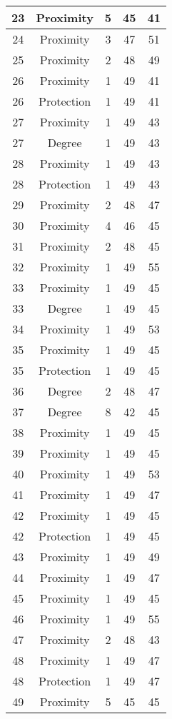 \documentclass[results.tex]{subfiles}
\begin{document}
\begin{center}
\begin{tabular}{| c || c | c | c | c |}
    \hline
    23 & Proximity & 5 & 45 & 41 \\ 
    \hline
    24 & Proximity & 3 & 47 & 51 \\ 
    \hline
    25 & Proximity & 2 & 48 & 49 \\ 
    \hline
    26 & Proximity & 1 & 49 & 41 \\ 
    \hline
    26 & Protection & 1 & 49 & 41 \\ 
    \hline
    27 & Proximity & 1 & 49 & 43 \\ 
    \hline
    27 & Degree & 1 & 49 & 43 \\ 
    \hline
    28 & Proximity & 1 & 49 & 43 \\ 
    \hline
    28 & Protection & 1 & 49 & 43 \\ 
    \hline
    29 & Proximity & 2 & 48 & 47 \\ 
    \hline
    30 & Proximity & 4 & 46 & 45 \\ 
    \hline
    31 & Proximity & 2 & 48 & 45 \\ 
    \hline
    32 & Proximity & 1 & 49 & 55 \\ 
    \hline
    33 & Proximity & 1 & 49 & 45 \\ 
    \hline
    33 & Degree & 1 & 49 & 45 \\ 
    \hline
    34 & Proximity & 1 & 49 & 53 \\ 
    \hline
    35 & Proximity & 1 & 49 & 45 \\ 
    \hline
    35 & Protection & 1 & 49 & 45 \\ 
    \hline
    36 & Degree & 2 & 48 & 47 \\ 
    \hline
    37 & Degree & 8 & 42 & 45 \\ 
    \hline
    38 & Proximity & 1 & 49 & 45 \\ 
    \hline
    39 & Proximity & 1 & 49 & 45 \\ 
    \hline
    40 & Proximity & 1 & 49 & 53 \\ 
    \hline
    41 & Proximity & 1 & 49 & 47 \\ 
    \hline
    42 & Proximity & 1 & 49 & 45 \\ 
    \hline
    42 & Protection & 1 & 49 & 45 \\ 
    \hline
    43 & Proximity & 1 & 49 & 49 \\ 
    \hline
    44 & Proximity & 1 & 49 & 47 \\ 
    \hline
    45 & Proximity & 1 & 49 & 45 \\ 
    \hline
    46 & Proximity & 1 & 49 & 55 \\ 
    \hline
    47 & Proximity & 2 & 48 & 43 \\ 
    \hline
    48 & Proximity & 1 & 49 & 47 \\ 
    \hline
    48 & Protection & 1 & 49 & 47 \\ 
    \hline
    49 & Proximity & 5 & 45 & 45 \\ 
    \hline   \end{tabular}
\end{center}
\end{document}

